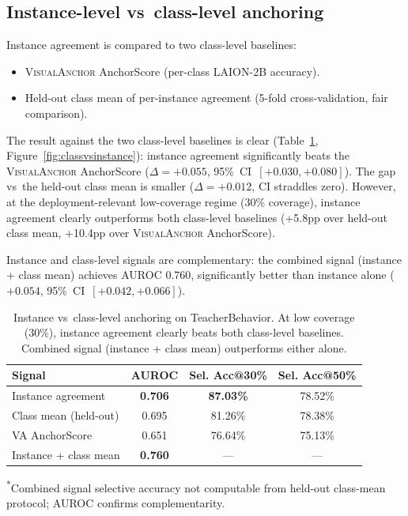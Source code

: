 \documentclass[a4paper,fleqn]{cas-sc}
\newcommand{\va}{\textsc{VisualAnchor}}
\begin{document}
\subsection{Instance-level vs~class-level anchoring}

Instance agreement is compared to two class-level baselines:
\begin{itemize}
    \item \va{} AnchorScore \citep{visualanchor} (per-class LAION-2B accuracy).
    \item Held-out class mean of per-instance agreement (5-fold cross-validation, fair comparison).
\end{itemize}

The result against the two class-level baselines is clear (Table~\ref{tab:classvsinstance}, Figure~\ref{fig:classvsinstance}): instance agreement significantly beats the \va{} AnchorScore ($\Delta = +0.055$, 95\%~CI~$[+0.030,+0.080]$).
The gap vs~the held-out class mean is smaller ($\Delta = +0.012$, CI straddles zero).
However, at the deployment-relevant low-coverage regime (30\% coverage), instance agreement clearly outperforms both class-level baselines (+5.8pp over held-out class mean, +10.4pp over \va{} AnchorScore).

Instance and class-level signals are complementary: the combined signal (instance + class mean) achieves AUROC 0.760, significantly better than instance alone ($+0.054$, 95\%~CI~$[+0.042,+0.066]$).

\begin{table}[t]
\centering
\caption{Instance vs~class-level anchoring on TeacherBehavior.
At low coverage (30\%), instance agreement clearly beats both class-level baselines.
Combined signal (instance + class mean) outperforms either alone.}
\label{tab:classvsinstance}
\small
\begin{tabular}{lccc}
\toprule
Signal & AUROC & Sel. Acc@30\% & Sel. Acc@50\% \\
\midrule
Instance agreement & \textbf{0.706} & \textbf{87.03\%} & 78.52\% \\
Class mean (held-out) & 0.695 & 81.26\% & 78.38\% \\
VA AnchorScore & 0.651 & 76.64\% & 75.13\% \\
Instance + class mean & \textbf{0.760} & --- & --- \\
\bottomrule
\end{tabular}
\par
\vspace{4pt}
\begin{minipage}{\textwidth}\raggedright\footnotesize\textsuperscript{*}Combined signal selective accuracy not computable from held-out class-mean protocol; AUROC confirms complementarity.\par\end{minipage}
\end{table}
\end{document}
